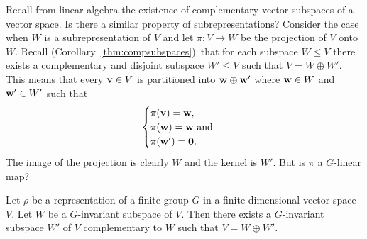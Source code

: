 Recall from linear algebra the existence of complementary vector subspaces of a vector space. Is there a similar property of subrepresentations? Consider the case when $W$ is a subrepresentation of $V$ and let $\pi: V \rightarrow W$ be the projection of $V$ onto $W$. Recall (Corollary~\ref{thm:compsubspaces})~that for each subspace $W\leq V$ there exists a complementary and disjoint subspace $W' \leq V$ such that $V = W \oplus W'$. This means that every $\mathbf{v} \in V$ is partitioned into $\mathbf{w} \oplus \mathbf{w}'$ where $\mathbf{w} \in W$ and $\mathbf{w}' \in W'$ such that 
\begin{align*}
	\begin{cases}
		\pi(\mathbf{v}) = \mathbf{w}, \\
		\pi(\mathbf{w}) = \mathbf{w} \text{ and } \\
		\pi(\mathbf{w}') = \mathbf{0}.
	\end{cases}
\end{align*} 
The image of the projection is clearly $W$ and the kernel is $W'$. But is $\pi$ a $G$-linear map?
\begin{proposition}\label{prop:complsubrepr}
	Let $\rho$ be a representation of a finite group $G$ in a finite-dimensional vector space $V$. Let $W$ be a $G$-invariant subspace of $V$. Then there exists a $G$-invariant subspace $W'$ of $V$ complementary to $W$ such that $V = W \oplus W'$.
\end{proposition}
